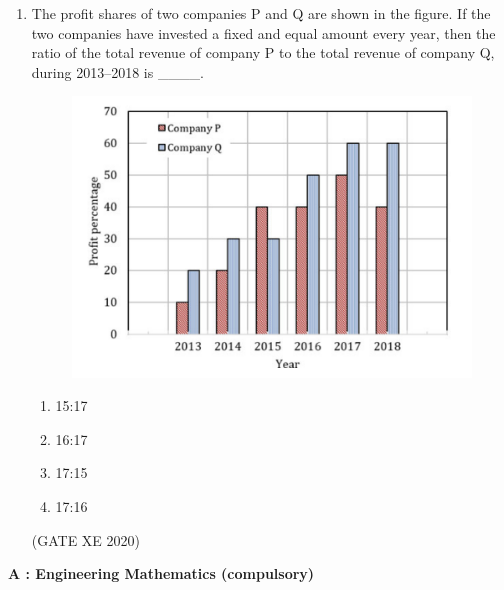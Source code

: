 \documentclass[12pt]{article}
\begin{document}
\begin{enumerate}
\item The profit shares of two companies P and Q are shown in the figure. If the two companies have invested a fixed and equal amount every year, then the ratio of the total revenue of company P to the total revenue of company Q, during 2013--2018 is \_\_\_\_.  

\begin{figure}[H]
    \centering
    \includegraphics[width=0.5\columnwidth]{figs/ass4_0_q10.png}
    \caption{}
    \label{fig:placeholder}
\end{figure}

\begin{enumerate}
\item 15:17
\item 16:17
\item 17:15
\item 17:16
\end{enumerate}
(GATE XE 2020)


\end{enumerate}

\newpage

\begin{center}
    {\Large \textbf{A : Engineering Mathematics (compulsory)}}
\end{center}  

  
\end{document}
